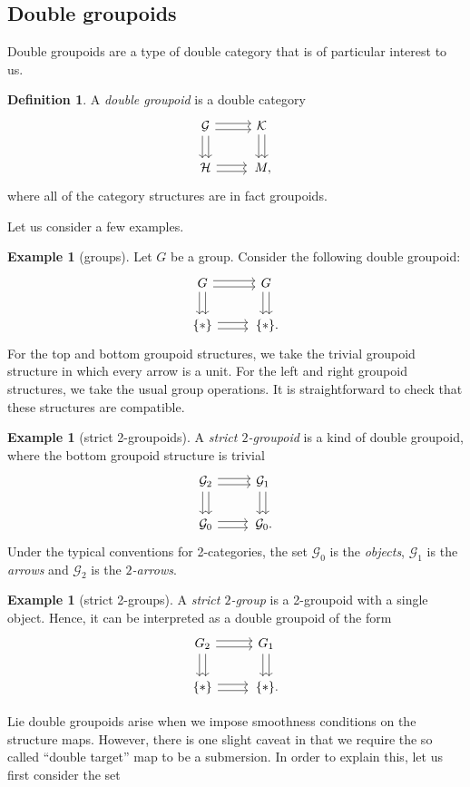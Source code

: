 \documentclass[pdftex]{sigma}
\numberwithin{equation}{section}
\theoremstyle{definition}
\newtheorem{Definition}[Theorem]{Definition}
\newtheorem{Example}[Theorem]{Example}
\newcommand{\CG}{\mathcal{G}}
\newcommand{\CH}{\mathcal{H}}
\newcommand{\CK}{\mathcal{K}}
\newcommand{\darrow}{\arrow[d, shift right] \arrow[d, shift left]}
\newcommand{\rarrow}{\arrow[r, shift right] \arrow[r, shift left]}
\begin{document}
\subsection{Double groupoids}
Double groupoids are a type of double category that is of particular interest to us.
\begin{Definition}
A \emph{double groupoid} is a double category
 \[\begin{tikzcd}
\CG \darrow \rarrow & \CK \darrow \\
\CH \rarrow & \,M,
\end{tikzcd}
\]
where all of the category structures are in fact groupoids.
\end{Definition}
Let us consider a few examples.
\begin{Example}[groups]
  Let $ G $ be a group. Consider the following double groupoid:
\[\begin{tikzcd}
G \darrow \rarrow & G \darrow \\
\{*\} \rarrow & \,\{*\}.
\end{tikzcd}
\]
For the top and bottom groupoid structures, we take the trivial groupoid structure in which every arrow is a unit. For the left and right groupoid structures, we take the usual group operations. It is straightforward to check that these structures are compatible.
\end{Example}
\begin{Example}[strict 2-groupoids]
A \emph{strict $2$-groupoid} is a kind of double groupoid, where the bottom groupoid structure is trivial
\[
\begin{tikzcd}
  \CG_2 \darrow \rarrow & \CG_1 \darrow \\
\CG_0 \rarrow & \,\CG_0.
\end{tikzcd}
\]
Under the typical conventions for 2-categories, the set $ \CG_0 $ is the \emph{objects}, $ \CG_1$ is the \emph{arrows} and $ \CG_2$ is the \emph{$2$-arrows}.
\end{Example}
\begin{Example}[strict 2-groups]
A \emph{strict $2$-group} is a 2-groupoid with a single object. Hence, it can be interpreted as a double groupoid of the form
\[
\begin{tikzcd}
  G_2 \darrow \rarrow & G_1 \darrow \\
\{ * \} \rarrow &\, \{ * \}.
\end{tikzcd}
\]

\end{Example}
Lie double groupoids arise when we impose smoothness conditions on the structure maps. However, there is one slight caveat in that we require the so called ``double target'' map to be a submersion. In order to explain this, let us first consider the set
\end{document}
